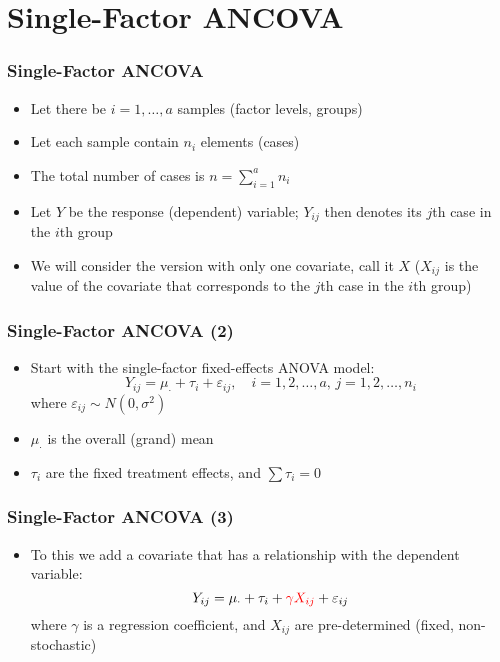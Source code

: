 \documentclass[10pt]{beamer}
\theoremstyle{definition}
\begin{document}
\section{Single-Factor ANCOVA}
\begin{frame}[fragile]
\frametitle{Single-Factor ANCOVA}
\begin{itemize}
	\item Let there be $i = 1,\ldots, a$ samples (factor levels, groups)
	\item Let each sample contain $n_{i}$ elements (cases)
	\item The total number of cases is $\displaystyle n = \sum_{i=1}^{a}n_{i}$
	\item Let $Y$ be the response (dependent) variable; $Y_{ij}$ then denotes its $j$th case in the $i$th group
	\item We will consider the version with only one covariate, call it $X$ ($X_{ij}$ is the value of the covariate that corresponds to the $j$th case in the $i$th group)
\end{itemize}
\end{frame}

\begin{frame}[fragile]
\frametitle{Single-Factor ANCOVA (2)}
\begin{itemize}
	\item Start with the single-factor fixed-effects ANOVA model:
	\[
		Y_{ij} = \mu_{\cdot} + \tau_{i} + \varepsilon_{ij},\quad i = 1,2,\ldots,a,\, j = 1,2,\ldots,n_{i}
	\]
	where $\varepsilon_{ij} \sim N(0,\sigma^{2})$
	\item $\mu_{\cdot}$ is the overall (grand) mean
	\item $\tau_{i}$ are the fixed treatment effects, and $\sum \tau_{i} = 0$
\end{itemize}
\end{frame}

\begin{frame}[fragile]
\frametitle{Single-Factor ANCOVA (3)}
\begin{itemize}
	\item To this we add a covariate that has a relationship with the dependent variable:
	\[
		Y_{ij} = \mu_{\cdot} + \tau_{i} + \textcolor{red}{\gamma X_{ij}} + \varepsilon_{ij}
	\]
	where $\gamma$ is a regression coefficient, and $X_{ij}$ are pre-determined (fixed, non-stochastic)
\end{itemize}
\end{frame}
\end{document}
